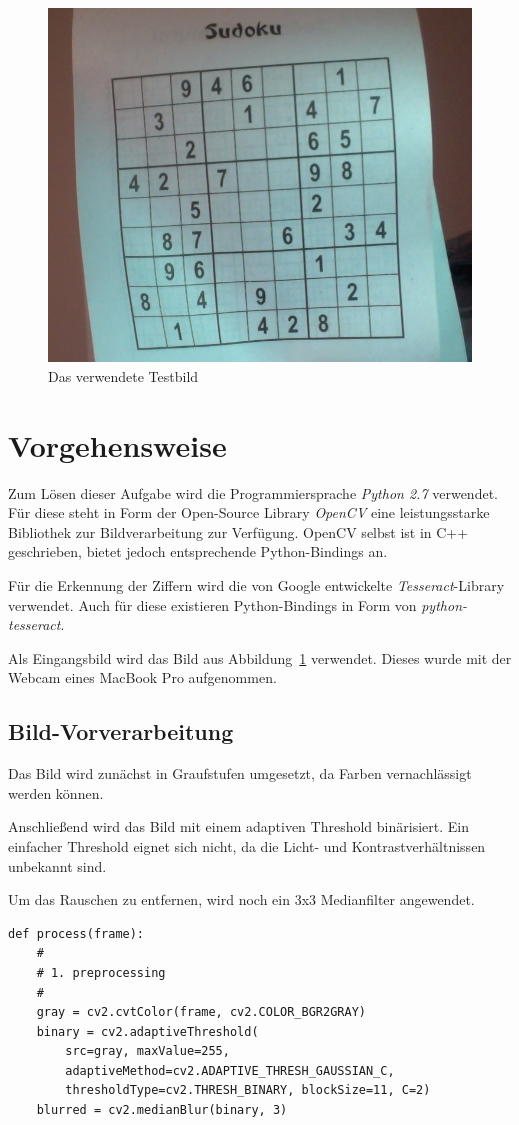 
\begin{figure}[t]
    \begin{center}
        \includegraphics[width=.5\textwidth]{Abbildungen/Input}
    \end{center}
    \caption{Das verwendete Testbild}
    \label{fig:Input}
\end{figure}

\section{Vorgehensweise}
Zum Lösen dieser Aufgabe wird die Programmiersprache \emph{Python 2.7} verwendet.
Für diese steht in Form der Open-Source Library \emph{OpenCV} eine leistungsstarke Bibliothek zur Bildverarbeitung zur Verfügung.
OpenCV selbst ist in C++ geschrieben, bietet jedoch entsprechende Python-Bindings an.

Für die Erkennung der Ziffern wird die von Google entwickelte \emph{Tesseract}-Library verwendet. Auch für diese existieren Python-Bindings in Form von \emph{python-tesseract}.

Als Eingangsbild wird das Bild aus Abbildung~\ref{fig:Input} verwendet. Dieses wurde mit der Webcam eines MacBook Pro aufgenommen.

\subsection{Bild-Vorverarbeitung}
Das Bild wird zunächst in Graufstufen umgesetzt, da Farben vernachlässigt werden können.

Anschließend wird das Bild mit einem adaptiven Threshold binärisiert. Ein einfacher Threshold eignet sich nicht, da die Licht- und Kontrastverhältnissen unbekannt sind.

Um das Rauschen zu entfernen, wird noch ein 3x3 Medianfilter angewendet.

\begin{lstlisting}
def process(frame):
    #
    # 1. preprocessing
    #
    gray = cv2.cvtColor(frame, cv2.COLOR_BGR2GRAY)
    binary = cv2.adaptiveThreshold(
        src=gray, maxValue=255,
        adaptiveMethod=cv2.ADAPTIVE_THRESH_GAUSSIAN_C,
        thresholdType=cv2.THRESH_BINARY, blockSize=11, C=2)
    blurred = cv2.medianBlur(binary, 3)
\end{lstlisting}

